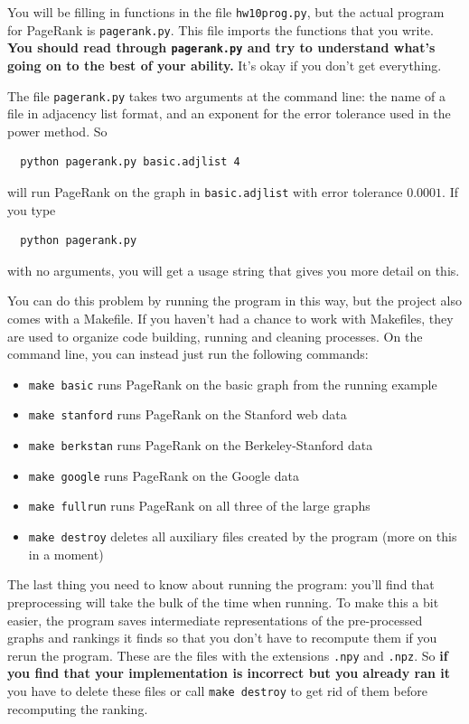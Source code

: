 \documentclass{article}
\theoremstyle{remark}
\begin{document}
You will be filling in functions in the file \texttt{hw10prog.py}, but the actual program for PageRank is \texttt{pagerank.py}.
This file imports the functions that you write.
\textbf{You should read through \texttt{pagerank.py} and try to understand what's going on to the best of your ability.}
It's okay if you don't get everything.

The file \texttt{pagerank.py} takes two arguments at the command line: the name of a file in adjacency list format, and an exponent for the error tolerance used in the power method.
So
\begin{lstlisting}
  python pagerank.py basic.adjlist 4
\end{lstlisting}
will run PageRank on the graph in \texttt{basic.adjlist} with error tolerance $0.0001$.
If you type
\begin{lstlisting}
  python pagerank.py
\end{lstlisting}
with no arguments, you will get a usage string that gives you more detail on this.

You can do this problem by running the program in this way, but the project also comes with a Makefile.
If you haven't had a chance to work with Makefiles, they are used to organize code building, running and cleaning processes.
On the command line, you can instead just run the following commands:
\begin{itemize}
\item \texttt{make basic} runs PageRank on the basic graph from the running example
\item \texttt{make stanford} runs PageRank on the Stanford web data
\item \texttt{make berkstan} runs PageRank on the Berkeley-Stanford data
\item \texttt{make google} runs PageRank on the Google data
\item \texttt{make fullrun} runs PageRank on all three of the large graphs
\item \texttt{make destroy} deletes all auxiliary files created by the program (more on this in a moment)
\end{itemize}
The last thing you need to know about running the program: you'll find that preprocessing will take the bulk of the time when running.
To make this a bit easier, the program saves intermediate representations of the pre-processed graphs and rankings it finds so that you don't have to recompute them if you rerun the program.
These are the files with the extensions \texttt{.npy} and \texttt{.npz}.
So \textbf{if you find that your implementation is incorrect but you already ran it} you have to delete these files or call \texttt{make destroy} to get rid of them before recomputing the ranking.
\end{document}
